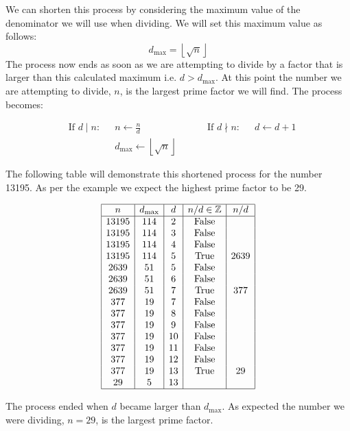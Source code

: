 \documentclass{article}
\begin{document}
We can shorten this process by considering the maximum value of the denominator we will use when dividing. We will set this maximum value as follows:
\[ d_\text{max} = \left\lfloor\sqrt{n}\right\rfloor\]
The process now ends as soon as we are attempting to divide by a factor that is larger than this calculated maximum i.e. \(d > d_\text{max}\). At this point the number we are attempting to divide, \(n\), is the largest prime factor we will find. The process becomes:

\[\begin{aligned}
    & \text{If \(d \mid n\):} &&  n \leftarrow \frac{n}{d}  & && & \text{If \(d \nmid n\):} && d \leftarrow d + 1 \\
    & && d_\text{max} \leftarrow \left\lfloor\sqrt{n}\right\rfloor 
\end{aligned}\]

The following table will demonstrate this shortened process for the number 13195. As per the example we expect the highest prime factor to be 29.

\[\begin{array}{|c|c|c|c|c|}
    \hline
    n & d_\text{max} & d & n/d \in \mathbb{Z} & n/d \\
    \hline
    13195 & 114 & 2 & \text{False} & \\
    13195 & 114 & 3 & \text{False} & \\
    13195 & 114 & 4 & \text{False} & \\
    13195 & 114 & 5 & \text{True} & 2639 \\
    2639 & 51 & 5 & \text{False} & \\
    2639 & 51 & 6 & \text{False} & \\
    2639 & 51 & 7 & \text{True} & 377 \\
    377 & 19 & 7 & \text{False} & \\
    377 & 19 & 8 & \text{False} & \\
    377 & 19 & 9 & \text{False} & \\
    377 & 19 & 10 & \text{False} & \\
    377 & 19 & 11 & \text{False} & \\
    377 & 19 & 12 & \text{False} & \\
    377 & 19 & 13 & \text{True} & 29 \\
    29 & 5 & 13 & & \\
    \hline
\end{array}\]

The process ended when \(d\) became larger than \(d_\text{max}\). As expected the number we were dividing, \(n=29\), is the largest prime factor.
\end{document}

